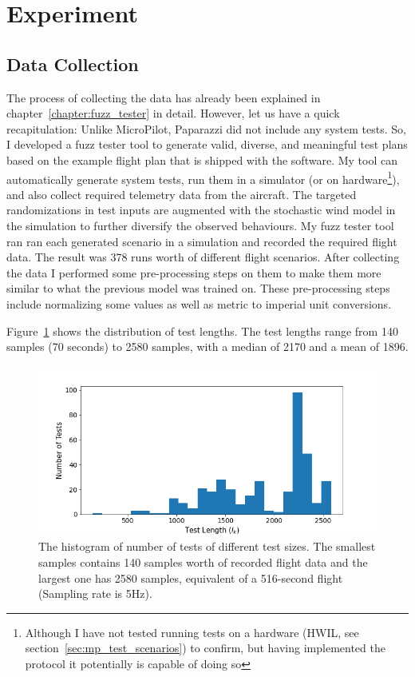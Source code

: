 \section{Experiment}
\subsection{Data Collection}
The process of collecting the data has already been explained in chapter~\ref{chapter:fuzz_tester} in detail. However, let us have a quick recapitulation:
Unlike MicroPilot, Paparazzi did not include any system tests. So, I developed a fuzz tester tool to generate valid, diverse, and meaningful test plans based on the example flight plan that is shipped with the software. My tool can automatically generate system tests, run them in a simulator (or on hardware\footnote{Although I have not tested running tests on a hardware (HWIL, see section~\ref{sec:mp_test_scenarios}) to confirm, but having implemented the protocol it potentially is capable of doing so}), and also collect required telemetry data from the aircraft. The targeted randomizations in test inputs are augmented with the stochastic wind model in the simulation to further diversify the observed behaviours. My fuzz tester tool ran ran each generated scenario in a simulation and recorded the required flight data.
The result was 378 runs worth of different flight scenarios.
After collecting the data I performed some pre-processing steps on them to make them more similar to what the previous model was trained on. These pre-processing steps include normalizing some values as well as metric to imperial unit conversions.

Figure~\ref{fig:paparazzi_test_length} shows the distribution of test lengths. The test lengths range from 140 samples (70 seconds) to 2580 samples, with a median of 2170 and a mean of 1896.
\begin{figure}
    \centering
    \includegraphics[width=\columnwidth]{6_files/test_lengths.png}
    \caption{The histogram of number of tests of different test sizes. The smallest samples contains 140 samples worth of recorded flight data and the largest one has 2580 samples, equivalent of a 516-second flight (Sampling rate is 5Hz). }
    \label{fig:paparazzi_test_length}
\end{figure}



